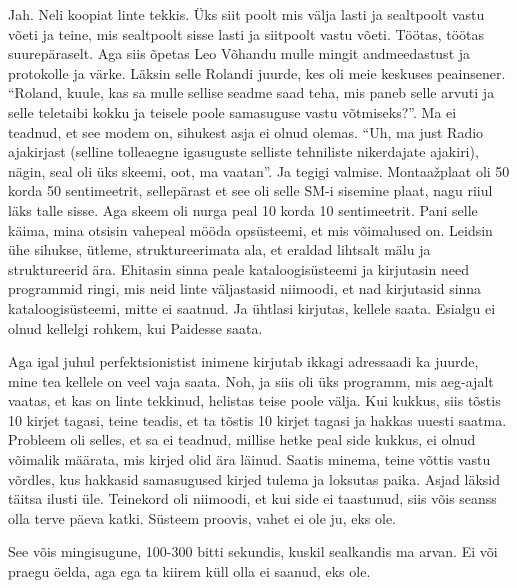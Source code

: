 
Jah. Neli koopiat linte tekkis. Üks siit poolt mis välja lasti ja sealtpoolt 
vastu võeti ja teine, mis sealtpoolt sisse lasti ja siitpoolt vastu võeti. 
Töötas, töötas suurepäraselt. Aga siis õpetas Leo Võhandu mulle mingit andmeedastust ja protokolle ja värke. Läksin selle Rolandi 
juurde, kes oli meie keskuses peainsener. \enquote{Roland, kuule, kas sa mulle 
sellise seadme saad teha, mis paneb selle arvuti ja selle teletaibi kokku ja 
teisele poole samasuguse  vastu võtmiseks?}. Ma ei teadnud, et see modem on, 
sihukest asja ei olnud olemas. \enquote{Uh, ma just Radio ajakirjast (selline 
tolleaegne igasuguste selliste tehniliste nikerdajate ajakiri), nägin, seal oli 
üks skeemi, oot, ma vaatan}. Ja tegigi valmise. Montaažplaat oli 50 korda 50 
sentimeetrit, sellepärast et see oli selle SM-i sisemine plaat, nagu riiul läks 
talle sisse. Aga skeem oli nurga peal 10 korda 10 sentimeetrit. Pani selle 
käima,  mina otsisin vahepeal mööda opsüsteemi, et mis võimalused on. Leidsin 
ühe sihukse, ütleme, struktureerimata ala, et eraldad lihtsalt mälu ja 
struktureerid ära. Ehitasin sinna peale kataloogisüsteemi ja kirjutasin need 
programmid ringi, mis neid linte väljastasid niimoodi, et nad kirjutasid sinna 
kataloogisüsteemi, mitte ei saatnud. Ja ühtlasi kirjutas, kellele saata. 
Esialgu ei olnud kellelgi rohkem, kui  Paidesse saata. 

Aga igal juhul perfektsionistist inimene kirjutab ikkagi adressaadi ka juurde, 
mine tea kellele on veel vaja saata. Noh, ja siis oli üks programm, mis 
aeg-ajalt vaatas, et kas on linte tekkinud, helistas teise poole välja. Kui 
kukkus, siis tõstis 10 kirjet tagasi, teine teadis, et ta tõstis 10 kirjet 
tagasi ja hakkas uuesti saatma. Probleem oli selles, et sa ei teadnud, millise 
hetke peal side kukkus, ei olnud võimalik määrata, mis kirjed olid ära läinud. 
Saatis minema, teine võttis vastu võrdles, kus hakkasid samasugused kirjed 
tulema ja loksutas paika. Asjad läksid täitsa ilusti üle. Teinekord oli 
niimoodi, et kui side ei taastunud, siis võis seanss olla terve päeva katki. 
Süsteem proovis, vahet ei ole ju, eks ole.


See võis mingisugune, 100-300 bitti sekundis, kuskil sealkandis ma arvan. Ei 
või praegu öelda, aga ega ta kiirem küll olla ei saanud, eks ole. 

